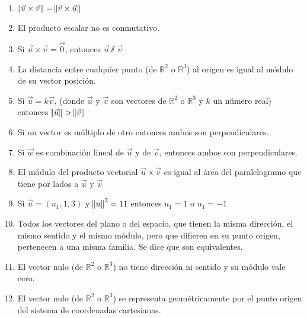 \documentclass[11pt,a4paper]{article}
\begin{document}
\begin{enumerate}
\begin{enumerate}[1)]
\item $\norm{\vec{u} \times \vec{v}} = \norm{\vec{v} \times \vec{u}}$ 
\item El producto escalar no es conmutativo.
\item Si $\vec{u} \times \vec{v} = \vec{0}$, entonces $\vec{u} \sslash \vec{v}$
\item La distancia entre cualquier punto (de $\mathbb{R}^{2}$ o $\mathbb{R}^{3}$) al origen es igual al m\'odulo de su vector posici\'on.
\item Si $\vec{u} = k \vec{v}$, (donde $\vec{u}$ y $\vec{v}$ son vectores de $\mathbb{R}^{2}$ o $\mathbb{R}^{3}$ y $k$ un n\'umero real) entonces $\norm{\vec{u}} > \norm{\vec{v}}$
\item Si un vector es m\'ultiplo de otro entonces ambos son perpendiculares.
\item Si $\vec{w}$ es combinaci\'on lineal de $\vec{u}$ y de $\vec{v}$, entonces ambos son perpendiculares.
\item El m\'odulo del producto vectorial $\vec{u} \times \vec{v}$ es igual al \'area del paralelogramo que tiene por lados a $\vec{u}$ y $\vec{v}$
\item Si $\vec{u} = (u_{1}, 1, 3)$ y $\norm{u}^{2} = 11$ entonces $u_{1} = 1$ o $u_{1} = -1$
\item Todos los vectores del plano o del espacio, que tienen la misma direcci\'on, el mismo sentido y el mismo m\'odulo, pero que difieren en su punto origen, pertenecen a una misma familia. Se dice que son equivalentes.
\item El vector nulo (de $\mathbb{R}^{2}$ o $\mathbb{R}^{3}$) no tiene direcci\'on ni sentido y su m\'odulo vale cero.
\item El vector nulo (de $\mathbb{R}^{2}$ o $\mathbb{R}^{3}$) se representa geom\'etricamente por el punto origen del sistema de
coordenadas cartesianas.
\end{enumerate}

\end{enumerate} %
\end{document}

